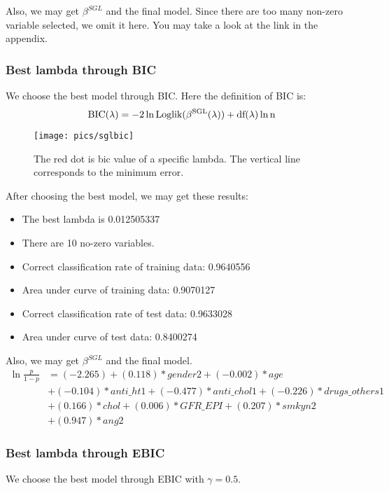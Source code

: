 \documentclass[]{article}
\begin{document}
Also, we may get $ \beta^{SGL} $ and the final model. Since there are too many non-zero variable selected, we omit it here. You may take a look at the link in the appendix.


\subsubsection{Best lambda through BIC}
We choose the best model through BIC. Here the definition of BIC is:
\begin{equation}
\rm BIC(\lambda)=-2\ln \rm Loglik(\beta^{SGL}(\lambda))+\rm df(\lambda) \ln n
\end{equation}

\begin{figure}[H]
	\centering
	\texttt{[image: pics/sglbic]}
	\caption{The red dot is bic value of a specific lambda. The vertical line corresponds to the minimum error.\label{fig=sglbic}}
\end{figure}

After choosing the best model, we may get these results:
\begin{itemize}
	\item The best lambda is 0.012505337
	\item There are 10 no-zero variables.
	\item Correct classification rate of training data: 0.9640556
	\item Area under curve of training data: 0.9070127 
	\item Correct classification rate of test data: 0.9633028
	\item Area under curve of test data: 0.8400274
\end{itemize}

Also, we may get $ \beta^{SGL} $ and the final model.
\begin{align*}
\ln\frac{p}{1-p}&=(-2.265) + (0.118)*gender2 + ( -0.002)*age\\ &+
( -0.104)*anti\_ht1 + ( -0.477)*anti\_chol1 + ( -0.226)*drugs\_others1 \\ &+
(0.166)*chol + (0.006)*GFR\_EPI + (0.207)*smkyn2 \\&+
(0.947)*ang2
\end{align*}

\subsubsection{Best lambda through EBIC}
We choose the best model through EBIC with $ \gamma=0.5 $.
\end{document}
